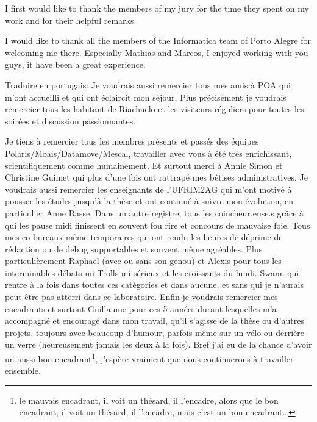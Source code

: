 

I first would like to thank the members of my jury for the time they spent on my work and for their helpful remarks.

I would like to thank all the members of the Informatica team of Porto Alegre for welcoming me there.
Especially Mathias and Marcos, I enjoyed working with you guys, it have been a great experience.

Traduire en portugais:
Je voudrais aussi remercier tous mes amis à POA qui m'ont accueilli et qui ont éclaircit mon séjour.
Plus précisément je voudrais remercier tous les habitant de Riachuelo et les visiteurs réguliers pour toutes les soirées et discussion passionnantes.

Je tiens à remercier tous les membres présents et passés des équipes Polaris/Moais/Datamove/Mescal, travailler avec vous à été très enrichissant, scientifiquement comme humainement.
Et surtout merci à Annie Simon et Christine Guimet qui plus d'une fois ont rattrapé mes bêtises administratives.
Je voudrais aussi remercier les enseignants de l'UFRIM2AG qui m'ont motivé à pousser les études jusqu'à la thèse et ont continué à suivre mon évolution, en particulier Anne Rasse.
Dans un autre registre, tous les coincheur.euse.s grâce à qui les pause midi finissent en souvent fou rire et concours de mauvaise foie.
Tous mes co-bureaux même temporaires qui ont rendu les heures de déprime de rédaction ou de debug supportables et souvent même agréables.
Plus particulièrement Raphaël (avec ou sans son genou) et Alexis pour tous les interminables débats mi-Trolls mi-sérieux et les croissants du lundi.
Swann qui rentre à la fois dans toutes ces catégories et dans aucune, et sans qui je n'aurais peut-être pas atterri dans ce laboratoire.
Enfin je voudrais remercier mes encadrants et surtout Guillaume pour ces 5 années durant lesquelles m'a accompagné et encouragé dans mon travail, qu'il s'agisse de la thèse ou d'autres projets, toujours avec beaucoup d'humour, parfois même sur un vélo ou derrière un verre (heureusement jamais les deux à la fois).
Bref j'ai eu de la chance d'avoir un aussi bon encadrant\footnote{
    le mauvais encadrant, il voit un thésard, il l'encadre, alors que le bon encadrant, il voit un thésard, il l'encadre, mais c'est un bon encadrant\ldots
}, j'espère vraiment que nous continuerons à travailler ensemble.


